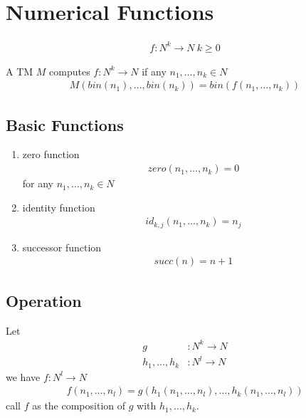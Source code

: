 \newpage

\section{Numerical Functions}
\begin{align*}
    f:N^k\to N\ k\ge 0
\end{align*}

\begin{definition}
    A TM $M$ computes $f:N^k\to N$ if any $n_1,\dots,n_k\in N$
    \begin{align*}
        M(bin(n_1),\dots,bin(n_k))=bin(f(n_1,\dots,n_k))
    \end{align*}
\end{definition}

\subsection{Basic Functions}
\begin{enumerate}
    \item zero function
    \begin{align*}
        zero(n_1,\dots,n_k)=0
    \end{align*}
    for any $n_1,\dots,n_k\in N$
    \item identity function
    \begin{align*}
        id_{k,j}(n_1,\dots,n_k)=n_j
    \end{align*}
    \item successor function
    \begin{align*}
        succ(n)=n+1
    \end{align*}
\end{enumerate}

\subsection{Operation}
\begin{definition}[composition]
    Let 
    \begin{align*}
        g&:N^k\to N\\
        h_1,\dots,h_k&:N^l\to N
    \end{align*}
    we have $f:N^l\to N$
    \begin{align*}
        f(n_1,\dots,n_l)=g(h_1(n_1,\dots,n_l),\dots,h_k(n_1,\dots,n_l))
    \end{align*}
    call $f$ as the composition of $g$ with $h_1,\dots,h_k$.
\end{definition}

